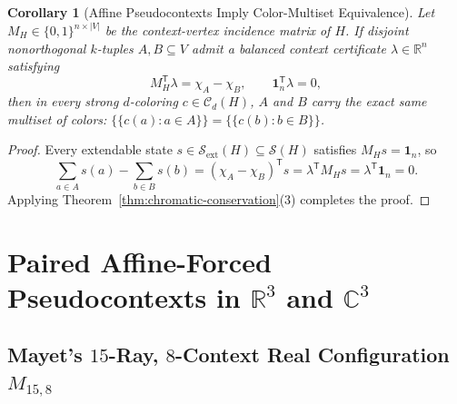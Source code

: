 \documentclass[aps,pra,reprint,superscriptaddress,longbibliography,nofootinbib,floatfix,10pt]{revtex4-2}
\newtheorem{corollary}[theorem]{Corollary}
\theoremstyle{definition}\newtheorem{definition}[theorem]{Definition}
\theoremstyle{remark}\newtheorem{remark}[theorem]{Remark}
\newcommand{\C}{\mathbb C}\newcommand{\R}{\mathbb R}\newcommand{\Q}{\mathbb Q}
\newcommand{\Sc}{\mathcal S}\newcommand{\Cc}{\mathcal C}\newcommand{\Wc}{\mathcal W}
\begin{document}
\begin{corollary}[Affine Pseudocontexts Imply Color-Multiset Equivalence]\label{cor:affine-to-chromatic}
Let $M_H\in\{0,1\}^{n\times |V|}$ be the context-vertex incidence matrix of $H$. If disjoint nonorthogonal $k$-tuples $A,B\subseteq V$ admit a balanced context certificate $\lambda\in\R^n$ satisfying~\cite{2026-Navara-Svozil-pseudocontexts}
\begin{equation}\label{eq:balanced-certificate}
M_H^{\mathsf T}\lambda = \chi_A - \chi_B,\qquad \mathbf{1}_n^{\mathsf T}\lambda = 0,
\end{equation}
then in every strong $d$-coloring $c\in\Cc_d(H)$, $A$ and $B$ carry the exact same multiset of colors: $\{\!\{c(a):a\in A\}\!\}=\{\!\{c(b):b\in B\}\!\}$.
\end{corollary}
\begin{proof}
Every extendable state $s\in\Sc_{\mathrm{ext}}(H)\subseteq\Sc(H)$ satisfies $M_H s=\mathbf{1}_n$, so
\[
\sum_{a\in A}s(a)-\sum_{b\in B}s(b)=(\chi_A-\chi_B)^{\mathsf T}s=\lambda^{\mathsf T}M_H s=\lambda^{\mathsf T}\mathbf{1}_n=0.
\]
Applying Theorem~\ref{thm:chromatic-conservation}(3) completes the proof.
\end{proof}

\section{Paired Affine-Forced Pseudocontexts in \texorpdfstring{$\R^3$ and $\C^3$}{R3 and C3}}\label{sec:paired-affine}

\subsection{Mayet's \texorpdfstring{$15$}{15}-Ray, \texorpdfstring{$8$}{8}-Context Real Configuration \texorpdfstring{$M_{15,8}$}{M15,8}}\label{sec:mayet}
\end{document}
